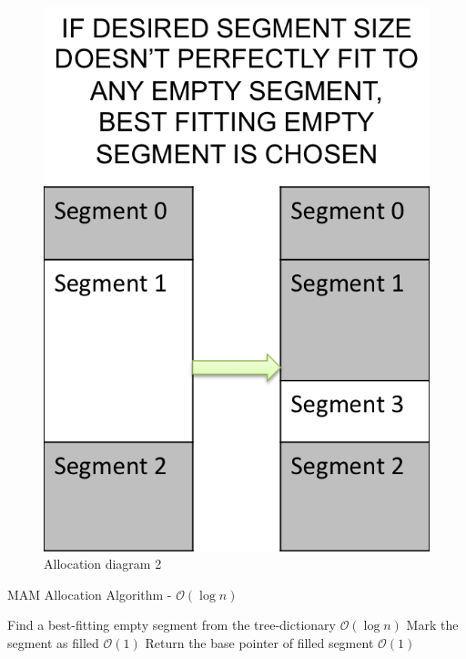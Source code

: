 \documentclass[conference]{IEEEtran}
\begin{document}
\begin{figure}[!hbp]
\begin{minipage}[b]{0.20\textwidth}
    \includegraphics[width=\linewidth]{allocation/allocation2.png}
  	\caption{Allocation diagram 2}
  	\label{fig:alloc2}
  \end{minipage}
\end{figure}

\begin{algorithm}                                                                                                  
\caption{MAM Allocation Algorithm - $\mathcal{O}(\log n)$}                                                                     
\label{algorithm1}                                                                                      
\begin{algorithmic}[1] 
\State Find a best-fitting empty segment from the tree-dictionary $\mathcal{O}(\log n)$
\State Mark the segment as filled $\mathcal{O}(1)$
\Else
\EndIf
\State Return the base pointer of filled segment $\mathcal{O}(1)$
\EndProcedure
\end{algorithmic} 
\end{algorithm}
\end{document}
